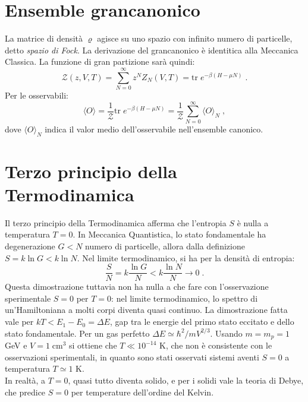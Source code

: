 \documentclass[10pt,a4paper]{report}
\theoremstyle{definition}
\numberwithin{equation}{section}
\newcommand{\bra}{\langle}
\newcommand{\ket}{\rangle}
\newcommand{\tr}{\mathrm{tr}}
\newcommand{\zpart}{\mathcal{Z}}
\begin{document}
\section{Ensemble grancanonico}
La matrice di densità $\varrho$ agisce su uno spazio con infinito numero di particelle, detto \emph{spazio di Fock}. La derivazione del grancanonico è identitica alla Meccanica Classica. La funzione di gran partizione sarà quindi:
\begin{equation}
\zpart(z,V,T)=\sum_{N=0}^{\infty} z^NZ_N(V,T)=\tr\;e^{-\beta(H-\mu N)}\;.
\end{equation}
Per le osservabili:
\begin{equation}
\bra O\ket=\frac{1}{\zpart}\tr\;e^{-\beta(H-\mu N)}=\frac{1}{\zpart}\sum_{N=0}^{\infty}\bra O\ket_N\;,
\end{equation}
dove $\bra O\ket_N$ indica il valor medio dell'osservabile nell'ensemble canonico.
\section{Terzo principio della Termodinamica}
Il terzo principio della Termodinamica afferma che l'entropia $S$ è nulla a temperatura $T=0$. In Meccanica Quantistica, lo stato fondamentale ha degenerazione $G<N$ numero di particelle, allora dalla definizione $S=k\ln G<k\ln N$. Nel limite termodinamico, si ha per la densità di entropia:
$$
\frac{S}{N}=k\frac{\ln G}{N}<k\frac{\ln N}{N}\to 0\;.
$$
Questa dimostrazione tuttavia non ha nulla a che fare con l'osservazione sperimentale $S=0$ per $T=0$: nel limite termodinamico, lo spettro di un'Hamiltoniana a molti corpi diventa quasi continuo. La dimostrazione fatta vale per $kT<E_1-E_0=\Delta E$, gap tra le energie del primo stato eccitato e dello stato fondamentale. Per un gas perfetto $\Delta E\simeq \hbar^2/mV^{2/3}$. Usando $m=m_p=1$ GeV e $V=1\;\mathrm{cm}^3$ si ottiene che $T\ll 10^{-14}$ K, che non è consistente con le osservazioni sperimentali, in quanto sono stati osservati sistemi aventi $S=0$ a temperatura $T\simeq 1$ K. \\
In realtà, a $T=0$, quasi tutto diventa solido, e per i solidi vale la teoria di Debye, che predice $S=0$ per temperature dell'ordine del Kelvin.
\end{document}
